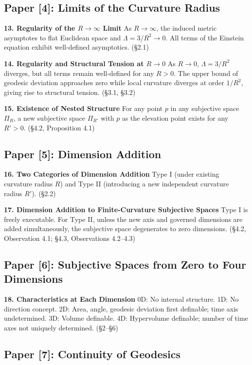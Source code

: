 \documentclass[12pt,a4paper]{article}
\begin{document}
\subsection*{Paper [4]: Limits of the Curvature Radius}

\textbf{13. Regularity of the $R \to \infty$ Limit}\quad
As $R \to \infty$, the induced metric asymptotes to flat Euclidean space and $\Lambda = 3/R^2 \to 0$. All terms of the Einstein equation exhibit well-defined asymptotics. (\S 2.1)

\textbf{14. Regularity and Structural Tension at $R \to 0$}\quad
As $R \to 0$, $\Lambda = 3/R^2$ diverges, but all terms remain well-defined for any $R > 0$. The upper bound of geodesic deviation approaches zero while local curvature diverges at order $1/R^2$, giving rise to structural tension. (\S 3.1, \S 3.2)

\textbf{15. Existence of Nested Structure}\quad
For any point $p$ in any subjective space $\Pi_R$, a new subjective space $\Pi_{R'}$ with $p$ as the elevation point exists for any $R' > 0$. (\S 4.2, Proposition 4.1)

\subsection*{Paper [5]: Dimension Addition}

\textbf{16. Two Categories of Dimension Addition}\quad
Type I (under existing curvature radius $R$) and Type II (introducing a new independent curvature radius $R'$). (\S 2.2)

\textbf{17. Dimension Addition to Finite-Curvature Subjective Spaces}\quad
Type I is freely executable. For Type II, unless the new axis and governed dimensions are added simultaneously, the subjective space degenerates to zero dimensions. (\S 4.2, Observation 4.1; \S 4.3, Observations 4.2--4.3)

\subsection*{Paper [6]: Subjective Spaces from Zero to Four Dimensions}

\textbf{18. Characteristics at Each Dimension}\quad
0D: No internal structure. 1D: No direction concept. 2D: Area, angle, geodesic deviation first definable; time axis undetermined. 3D: Volume definable. 4D: Hypervolume definable; number of time axes not uniquely determined. (\S 2--\S 6)

\subsection*{Paper [7]: Continuity of Geodesics}
\end{document}
